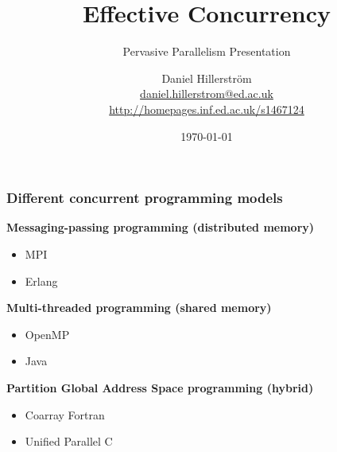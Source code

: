 \documentclass[10pt,compress]{beamer}
\author[Daniel Hillerström]{Daniel Hillerström\\\footnotesize{\href{mailto:daniel.hillerstrom@ed.ac.uk}{daniel.hillerstrom@ed.ac.uk}}\\\footnotesize{\href{http://homepages.inf.ed.ac.uk/s1467124}{http://homepages.inf.ed.ac.uk/s1467124}}}
\institute[University of Edinburgh]{CDT Pervasive Parallelism, University of Edinburgh}
\date{\today}
\title{Effective Concurrency} %
\subtitle{Pervasive Parallelism Presentation}
\begin{document}
  \maketitle

  \begin{frame}
    \frametitle{Different concurrent programming models}
    \textbf{Messaging-passing programming (distributed memory)}
    \begin{itemize}
      \item MPI
      \item Erlang
    \end{itemize}
    \textbf{Multi-threaded programming (shared memory)}
    \begin{itemize}
      \item OpenMP
      \item Java
    \end{itemize}
    \textbf{Partition Global Address Space programming (hybrid)}
    \begin{itemize}
      \item Coarray Fortran
      \item Unified Parallel C
    \end{itemize}
  \end{frame}
\end{document}
